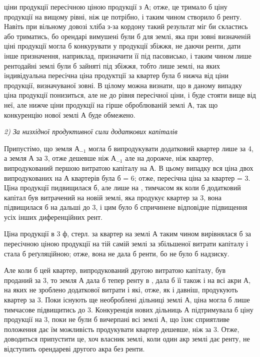 \parcont{}  %
ціни продукції пересічною ціною продукції з $А$; отже, це тримало б ціну продукції
на вищому рівні, ніж це потрібно, і таким чином створило б ренту.
Навіть при вільному довозі хліба з-за кордону такий результат міг би скластись
або триматись, бо орендарі вимушені були б для землі, яка при зовні
визначеній ціні продукції могла б конкурувати у продукції збіжжя, не даючи
ренти, дати інше призначення, наприклад, призначити її під пасовисько, і таким
чином лише рентодайні землі були б зайняті під збіжжя, тобто лише землі,
на яких індивідуальна пересічна ціна продуктції за квартер була б нижча від
ціни продукції, визначуваної зовні. В цілому можна визнати, що в даному випадку
ціна продукції понизиться, але не до рівня пересічної ціни, і буде стояти
вище від неї, але нижче ціни продукції на гірше оброблюваній землі $А$, так
що конкуренцію нової землі $А$ буде обмежено.

\emph{2) За низхідної продуктивної сили додаткових капіталів}

Припустімо, що земля $А_{-1}$ могла б випродукувати додатковий квартер
лише за 4, а земля $А$ за 3, отже дешевше ніж $А_{-1}$ але на  дорожче, ніж квартер, випродукований першою витратою капіталу на
$А$. В цьому випадку вся ціна двох випродукованих на $А$ квартерів була б =
6; отже, пересічна ціна за квартер = 3. Ціна продукції
пидвищилася б, але лише на , тимчасом як коли б додатковий
капітал був витрачений на новій землі, яка продукує квартер за 3, вона підвищилася б на дальші  до 3, і цим
було б спричинене відповідне підвищення усіх інших диференційних рент.

Ціна продукції в 3 ф, стерл. за квартер на землі $А$ таким чином
вирівнялася б за пересічною ціною продукції на тій самій землі за збільшеної
витрати капіталу і стала б реґуляційною; отже, вона не дала б ренти, бо не
було б надзиску.

Але коли б цей квартер, випродукований другою витратою капіталу, був проданий
за 3, то земля $А$ дала б тепер ренту в ,
дала б її також і на всі акри А, на яких не зроблено додаткової витрати і
які, отже, як і давніш, продукують квартер за 3. Поки існують ще
необроблені дільниці землі $А$, ціна могла б лише тимчасове підвищитись до
3. Конкуренція нових дільниць $А$ підтримувала б ціну продукції
на 3, поки не були б вичерпані всі землі $А$, що їхнє сприятливе положення
дає їм можливість продукувати квартер дешевше, ніж за 3.
Отже, доводиться припустити це, хоч власник землі, коли один акр землі дає ренту,
не відступить орендареві другого акра без ренти.

